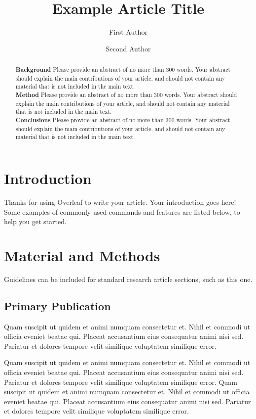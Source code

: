 \documentclass[fleqn,10pt]{amj}
\title{Example Article Title}
\author[1][corr.author@xyz.ac.mm]{First Author}
\author[2]{Second Author}
\affil[1]{Address of first author}
\affil[2]{Address of second author}
\begin{document}
\maketitle

\begin{abstract}
\textbf{Background} Please provide an abstract of no more than 300 words. Your abstract should explain the main contributions of your article, and should not contain any material that is not included in the main text.\\
\textbf{Method} Please provide an abstract of no more than 300 words. Your abstract should explain the main contributions of your article, and should not contain any material that is not included in the main text.
\\ \textbf{Conclusions} Please provide an abstract of no more than 300 words. Your abstract should explain the main contributions of your article, and should not contain any material that is not included in the main text.
\end{abstract}



\section{Introduction}

Thanks for using Overleaf to write your article. Your introduction goes here! Some examples of commonly used commands and features are listed below, to help you get started.

\section{Material and Methods}

Guidelines can be included for standard research article sections, such as this one. 

\subsection{Primary Publication}

Quam suscipit ut quidem et animi numquam consectetur et. Nihil et commodi ut officia eveniet beatae qui. Placeat accusantium eius consequatur animi nisi sed. Pariatur et dolores tempore velit similique voluptatem similique error.

Quam suscipit ut quidem et animi numquam consectetur et. Nihil et commodi ut officia eveniet beatae qui. Placeat accusantium eius consequatur animi nisi sed. Pariatur et dolores tempore velit similique voluptatem similique error. Quam suscipit ut quidem et animi numquam consectetur et. Nihil et commodi ut officia eveniet beatae qui. Placeat accusantium eius consequatur animi nisi sed. Pariatur et dolores tempore velit similique voluptatem similique error.
\end{document}
